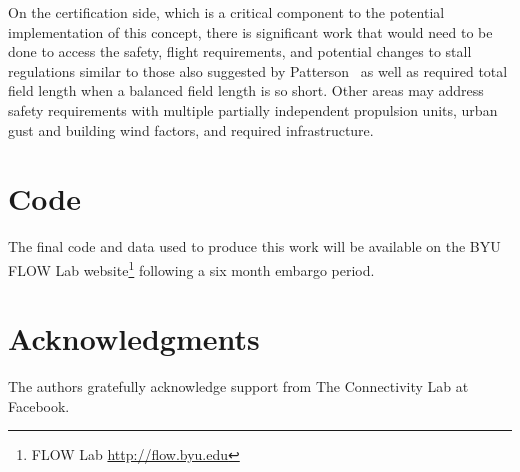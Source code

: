 \documentclass[conf]{new-aiaa}
\begin{document}
On the certification side, which is a critical component to the potential implementation of this concept, there is significant work that would need to be done to access the safety, flight requirements, and potential changes to stall regulations similar to those also suggested by Patterson~\cite{Patterson:2017aa} as well as required total field length when a balanced field length is so short. Other areas may address safety requirements with multiple partially independent propulsion units, urban gust and building wind factors, and required infrastructure.

\section{Code}


The final code and data used to produce this work will be available on the BYU FLOW Lab website\footnote{FLOW Lab \href{http://flow.byu.edu}{http://flow.byu.edu}} following a six month embargo period.


\section*{Acknowledgments}

The authors gratefully acknowledge support from The Connectivity Lab at Facebook.

\newpage



\end{document}
